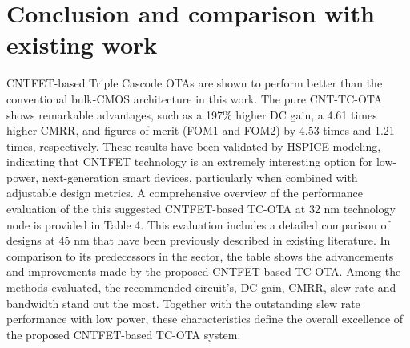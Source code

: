 
\section*{Conclusion and comparison with existing work}

CNTFET-based Triple Cascode OTAs are shown to perform better than the
conventional bulk-CMOS architecture in this work. The pure CNT-TC-OTA shows
remarkable advantages, such as a 197\% higher DC gain, a 4.61 times higher CMRR,
and figures of merit (FOM1 and FOM2) by 4.53 times and 1.21 times, respectively.
These results have been validated by HSPICE modeling, indicating that CNTFET
technology is an extremely interesting option for low-power, next-generation
smart devices, particularly when combined with adjustable design metrics.
A comprehensive overview of the performance evaluation of the this suggested
CNTFET-based TC-OTA at 32 nm technology node is provided in Table 4. This
evaluation includes a detailed comparison of designs at 45 nm that have been
previously described in existing literature. In comparison to its predecessors
in the sector, the table shows the advancements and improvements made by the
proposed CNTFET-based TC-OTA. Among the methods evaluated, the recommended
circuit's, DC gain, CMRR, slew rate and bandwidth stand out the most. Together
with the outstanding slew rate performance with low power, these characteristics
define the overall excellence of the proposed CNTFET-based TC-OTA system.


